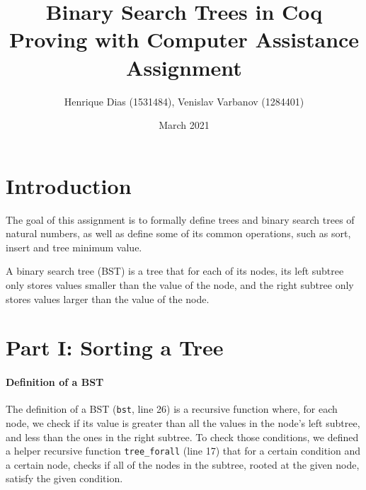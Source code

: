 \documentclass[a4paper]{article}
\title{%
  Binary Search Trees in Coq \\
  \large Proving with Computer Assistance Assignment}
\author{Henrique Dias (1531484), Venislav Varbanov (1284401)}
\date{March 2021}
\begin{document}
\maketitle

\section{Introduction}

The goal of this assignment is to formally define trees and binary search trees of natural numbers, as well as define some of its common operations, such as sort, insert and tree minimum value.

A binary search tree (BST) is a tree that for each of its nodes, its left subtree only stores values smaller than the value of the node, and the right subtree only stores values larger than the value of the node.



\section{Part I: Sorting a Tree}

\paragraph{Definition of a BST}

The definition of a BST (\texttt{bst}, line 26) is a recursive function where, for each node, we check if its value is greater than all the values in the node's left subtree, and less than the ones in the right subtree. To check those conditions, we defined a helper recursive function \texttt{tree\_forall} (line 17) that for a certain condition and a certain node, checks if all of the nodes in the subtree, rooted at the given node, satisfy the given condition.
\end{document}
